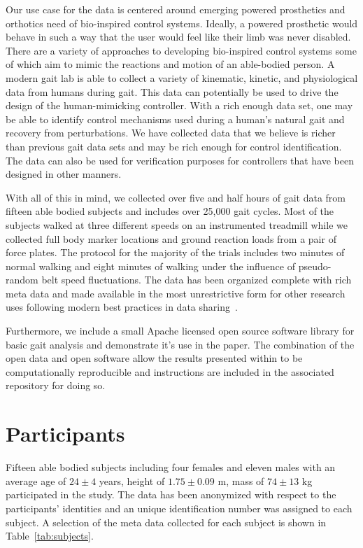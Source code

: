 \documentclass[10pt,a4paper,twocolumn]{article}
\begin{document}
Our use case for the data is centered around emerging powered prosthetics and
orthotics need of bio-inspired control systems. Ideally, a powered prosthetic
would behave in such a way that the user would feel like their limb was never
disabled. There are a variety of approaches to developing bio-inspired control
systems some of which aim to mimic the reactions and motion of an able-bodied
person. A modern gait lab is able to collect a variety of kinematic, kinetic,
and physiological data from humans during gait. This data can potentially be
used to drive the design of the human-mimicking controller. With a rich enough
data set, one may be able to identify control mechanisms used during a human's
natural gait and recovery from perturbations. We have collected data that we
believe is richer than previous gait data sets and may be rich enough for
control identification.  The data can also be used for verification purposes
for controllers that have been designed in other manners.

With all of this in mind, we collected over five and half hours of gait data
from fifteen able bodied subjects and includes over 25,000 gait cycles. Most of
the subjects walked at three different speeds on an instrumented treadmill
while we collected full body marker locations and ground reaction loads from a
pair of force plates. The protocol for the majority of the trials includes two
minutes of normal walking and eight minutes of walking under the influence of
pseudo-random belt speed fluctuations. The data has been organized complete with
rich meta data and made available in the most unrestrictive form for other
research uses following modern best practices in data sharing~\cite{White2013}.

Furthermore, we include a small Apache licensed open source software library
for basic gait analysis and demonstrate it's use in the paper. The combination
of the open data and open software allow the results presented within to be
computationally reproducible and instructions are included in the associated
repository for doing so.

\section*{Participants}
%
Fifteen able bodied subjects including four females and eleven males with an
average age of $24\pm4$ years, height of $1.75\pm0.09$ m, mass of $74\pm13$ kg
participated in the study. The data has been anonymized with respect to the
participants' identities and an unique identification number was assigned to
each subject. A selection of the meta data collected for each subject is shown
in Table~\ref{tab:subjects}.
%
\begin{table}
  \cprotect\caption{Information about the 15 participants. The final three
    columns give the trial numbers associated with each nominal treadmill
    speed. Additional trials with subject 0 are trials with no subject, i.e.
    unloaded trials that can be used for force compensation purposes, and are
    not shown in the table. Generated by \verb|src/subject_table.py|.}
  \centering
  
  \label{tab:subjects}
\end{table}
\end{document}
